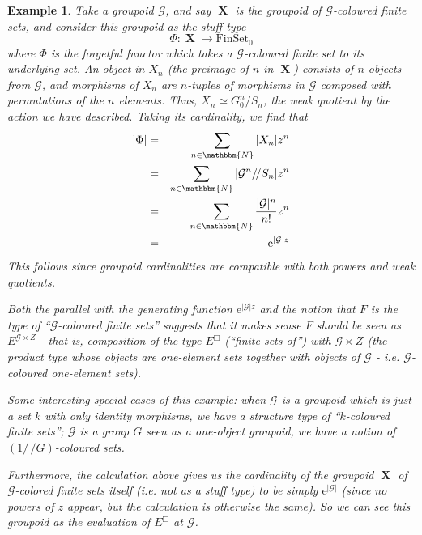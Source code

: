 \documentclass{amsart} \usepackage{amsmath,amssymb,bbm}
\newcommand{\opname}[1]{\operatorname{#1}}
\newcommand{\catname}[1]{\boldsymbol{\opname{{#1}}}}
\newcommand{\FSN}{\catname{FinSet_0}}
\newtheorem{varexample}{Example}
\newenvironment{example}{\begin{varexample}\em}{\em\end{varexample}}
\newcommand{\mathe}{\mathrm{e}}
\begin{document}
\begin{example}\label{ex:compcolour}
  Take a groupoid $\mathcal{G}$, and say $\catname{X}$ is the groupoid
  of $\mathcal{G}$-coloured finite sets, and consider this groupoid as
  the stuff type \[ \Phi : \catname{X} \rightarrow \FSN \] where
  $\Phi$ is the forgetful functor which takes a $\mathcal{G}$-coloured
  finite set to its underlying set.  An object in $X_n$ (the preimage
  of $n$ in $\catname{X}$) consists of $n$ objects from $\mathcal{G}$,
  and morphisms of $X_n$ are $n$-tuples of morphisms in $\mathcal{G}$
  composed with permutations of the $n$ elements.  Thus, $X_n \simeq
  G_0^n / S_n$, the weak quotient by the action we have
  described. Taking its cardinality, we find that
  \begin{eqnarray}\label{eq:compcolour}
     |\Phi| & = & \sum_{n \in \mathbbm{N}} |X_n |z^n\\
     \nonumber & = & \sum_{n \in \mathbbm{N}} | {\mathcal{G}^n}/\,\!\!/{S_n}
     | z^n\\
     \nonumber & = & \sum_{n \in \mathbbm{N}} \frac{|\mathcal{G}|^n}{n!} z^n\\
     \nonumber & = & \mathe^{| \mathcal{G} |z}
  \end{eqnarray}
  This follows since groupoid cardinalities are compatible with both
  powers and weak quotients.

  Both the parallel with the generating function $\mathe^{|
  \mathcal{G} |z}$ and the notion that $F$ is the type of
  ``$\mathcal{G}$-coloured finite sets'' suggests that it makes sense
  $F$ should be seen as $E^{\mathcal{G} \times Z}$ - that is,
  composition of the type $E^{\Box}$ (``finite sets of'') with
  $\mathcal{G} \times Z$ (the product type whose objects are
  one-element sets together with objects of $\mathcal{G}$ -
  i.e. $\mathcal{G}$-coloured one-element sets).
  
  Some interesting special cases of this example: when $\mathcal{G}$
  is a groupoid which is just a set $k$ with only identity morphisms,
  we have a {\textit{structure type}} of ``$k$-coloured finite sets'';
  $\mathcal{G}$ is a group $G$ seen as a one-object groupoid, we have
  a notion of $(1/\,\!\!/G)$-coloured sets.

  Furthermore, the calculation above gives us the cardinality of the
  groupoid $\catname{X}$ of $\mathcal{G}$-colored finite sets itself
  (i.e. not as a stuff type) to be simply $\mathe^{|\mathcal{G}|}$
  (since no powers of $z$ appear, but the calculation is otherwise the
  same).  So we can see this groupoid as the evaluation of $E^{\Box}$
  at $\mathcal{G}$.
\end{example}
\end{document}
